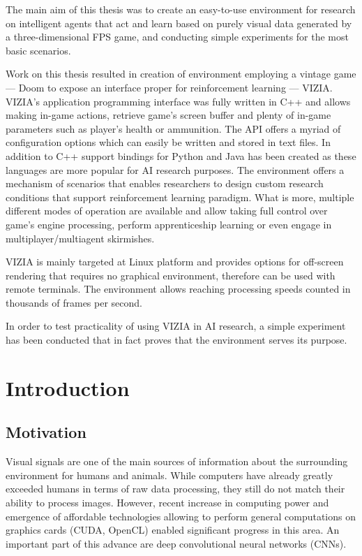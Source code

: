 \documentclass[english,bachelor,a4paper,twoside]{ppfcmthesis}
\begin{document}
The main aim of this thesis was to create an easy-to-use environment for research on intelligent agents that act and learn based on purely visual data generated by a three-dimensional FPS game, and conducting simple experiments for the most basic scenarios.


Work on this thesis resulted in creation of environment employing a vintage game --- Doom to expose an interface proper for reinforcement learning --- VIZIA. VIZIA's application programming interface was fully written in C++ and allows making in-game actions, retrieve game's screen buffer and plenty of in-game parameters such as player's health or ammunition. 
The API offers a myriad of configuration options which can easily be written and stored in text files.
In addition to C++ support bindings for Python and Java has been created as these languages are more popular for AI research purposes. 
The environment offers a mechanism of scenarios that enables researchers to design custom research conditions that support reinforcement learning paradigm.
What is more, multiple different modes of operation are available and allow taking full control over game's engine processing, perform apprenticeship learning or even engage in multiplayer/multiagent skirmishes. 

VIZIA is mainly targeted at Linux platform and provides options for off-screen rendering that requires no graphical environment, therefore can be used with remote terminals.
The environment allows reaching processing speeds counted in thousands of frames per second.

In order to test practicality of using VIZIA in AI research, a simple experiment has been conducted that in fact proves that the environment serves its purpose.
\cleardoublepage

\pagestyle{ppfcmthesis}%
\tableofcontents* \cleardoublepage%

\mainmatter%



\chapter{Introduction}
\label{ch:introduction}
\section{Motivation}
\label{sec:motivation}

Visual signals are one of the main sources of information about the surrounding environment for humans and animals.
While computers have already greatly exceeded humans in terms of raw data processing, they still do not match their ability to process images.
However, recent increase in computing power and emergence of affordable technologies allowing to perform general computations on graphics cards (CUDA, OpenCL) enabled significant progress in this area.
An important part of this advance are deep convolutional neural networks (CNNs).
\end{document}
